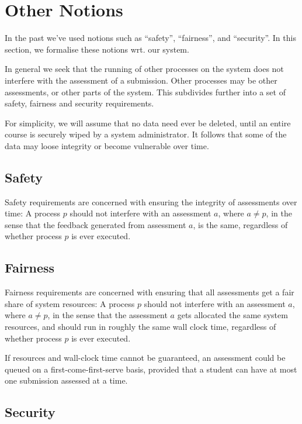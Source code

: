 
\section{Other Notions}

In the past we've used notions such as ``safety'', ``fairness'', and
``security''.  In this section, we formalise these notions wrt. our system.

In general we seek that the running of other processes on the system does not
interfere with the assessment of a submission. Other processes may be other
assessments, or other parts of the system. This subdivides further into a set
of safety, fairness and security requirements.

For simplicity, we will assume that no data need ever be deleted, until an
entire course is securely wiped by a system administrator. It follows that some
of the data may loose integrity or become vulnerable over time.

\subsection{Safety}

Safety requirements are concerned with ensuring the integrity of assessments
over time: A process $p$ should not interfere with an assessment $a$, where
$a\neq p$, in the sense that the feedback generated from assessment $a$, is the
same, regardless of whether process $p$ is ever executed.

\subsection{Fairness}

Fairness requirements are concerned with ensuring that all assessments get a
fair share of system resources: A process $p$ should not interfere with an
assessment $a$, where $a\neq p$, in the sense that the assessment $a$ gets
allocated the same system resources, and should run in roughly the same wall
clock time, regardless of whether process $p$ is ever executed.

If resources and wall-clock time cannot be guaranteed, an assessment could be
queued on a first-come-first-serve basis, provided that a student can have at
most one submission assessed at a time.

\subsection{Security}

